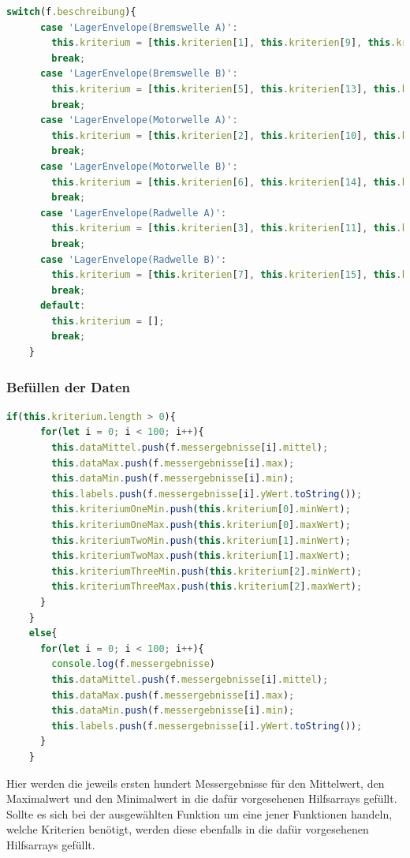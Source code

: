 \begin{lstlisting}[language=Typescript, caption={Filtern der Kriterien}]
    switch(f.beschreibung){
      case 'LagerEnvelope(Bremswelle A)':
        this.kriterium = [this.kriterien[1], this.kriterien[9], this.kriterien[19]];
        break;
      case 'LagerEnvelope(Bremswelle B)':
        this.kriterium = [this.kriterien[5], this.kriterien[13], this.kriterien[23]];
        break;
      case 'LagerEnvelope(Motorwelle A)':
        this.kriterium = [this.kriterien[2], this.kriterien[10], this.kriterien[20]];
        break;
      case 'LagerEnvelope(Motorwelle B)':
        this.kriterium = [this.kriterien[6], this.kriterien[14], this.kriterien[24]];
        break;
      case 'LagerEnvelope(Radwelle A)':
        this.kriterium = [this.kriterien[3], this.kriterien[11], this.kriterien[21]];
        break;
      case 'LagerEnvelope(Radwelle B)':
        this.kriterium = [this.kriterien[7], this.kriterien[15], this.kriterien[25]];
        break;
      default:
        this.kriterium = [];
        break;
    }
\end{lstlisting}

\subsubsection{Befüllen der Daten}
\begin{lstlisting}[language=Typescript, caption={Befüllen der Daten}]
    if(this.kriterium.length > 0){
      for(let i = 0; i < 100; i++){
        this.dataMittel.push(f.messergebnisse[i].mittel);
        this.dataMax.push(f.messergebnisse[i].max);
        this.dataMin.push(f.messergebnisse[i].min);
        this.labels.push(f.messergebnisse[i].yWert.toString());
        this.kriteriumOneMin.push(this.kriterium[0].minWert);
        this.kriteriumOneMax.push(this.kriterium[0].maxWert);
        this.kriteriumTwoMin.push(this.kriterium[1].minWert);
        this.kriteriumTwoMax.push(this.kriterium[1].maxWert);
        this.kriteriumThreeMin.push(this.kriterium[2].minWert);
        this.kriteriumThreeMax.push(this.kriterium[2].maxWert);
      }
    }
    else{
      for(let i = 0; i < 100; i++){
        console.log(f.messergebnisse)
        this.dataMittel.push(f.messergebnisse[i].mittel);
        this.dataMax.push(f.messergebnisse[i].max);
        this.dataMin.push(f.messergebnisse[i].min);
        this.labels.push(f.messergebnisse[i].yWert.toString());
      }
    }
\end{lstlisting}

Hier werden die jeweils ersten hundert Messergebnisse für den Mittelwert, den Maximalwert und den Minimalwert in die dafür vorgesehenen
Hilfsarrays gefüllt. Sollte es sich bei der ausgewählten Funktion um eine jener Funktionen handeln, welche Kriterien benötigt, werden 
diese ebenfalls in die dafür vorgesehenen Hilfsarrays gefüllt.

